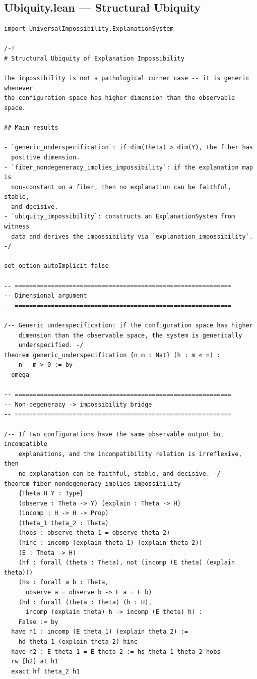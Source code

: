 \documentclass[11pt,a4paper]{article}
\begin{document}
\subsection{Ubiquity.lean --- Structural Ubiquity}
\label{app:lean-ubiquity}

\begin{lstlisting}[caption={Ubiquity.lean --- complete file},label={lst:ubiquity}]
import UniversalImpossibility.ExplanationSystem

/-!
# Structural Ubiquity of Explanation Impossibility

The impossibility is not a pathological corner case -- it is generic whenever
the configuration space has higher dimension than the observable space.

## Main results

- `generic_underspecification`: if dim(Theta) > dim(Y), the fiber has
  positive dimension.
- `fiber_nondegeneracy_implies_impossibility`: if the explanation map is
  non-constant on a fiber, then no explanation can be faithful, stable,
  and decisive.
- `ubiquity_impossibility`: constructs an ExplanationSystem from witness
  data and derives the impossibility via `explanation_impossibility`.
-/

set_option autoImplicit false

-- ============================================================
-- Dimensional argument
-- ============================================================

/-- Generic underspecification: if the configuration space has higher
    dimension than the observable space, the system is generically
    underspecified. -/
theorem generic_underspecification {n m : Nat} (h : m < n) :
    n - m > 0 := by
  omega

-- ============================================================
-- Non-degeneracy -> impossibility bridge
-- ============================================================

/-- If two configurations have the same observable output but incompatible
    explanations, and the incompatibility relation is irreflexive, then
    no explanation can be faithful, stable, and decisive. -/
theorem fiber_nondegeneracy_implies_impossibility
    {Theta H Y : Type}
    (observe : Theta -> Y) (explain : Theta -> H)
    (incomp : H -> H -> Prop)
    (theta_1 theta_2 : Theta)
    (hobs : observe theta_1 = observe theta_2)
    (hinc : incomp (explain theta_1) (explain theta_2))
    (E : Theta -> H)
    (hf : forall (theta : Theta), not (incomp (E theta) (explain theta)))
    (hs : forall a b : Theta,
      observe a = observe b -> E a = E b)
    (hd : forall (theta : Theta) (h : H),
      incomp (explain theta) h -> incomp (E theta) h) :
    False := by
  have h1 : incomp (E theta_1) (explain theta_2) :=
    hd theta_1 (explain theta_2) hinc
  have h2 : E theta_1 = E theta_2 := hs theta_1 theta_2 hobs
  rw [h2] at h1
  exact hf theta_2 h1


\end{lstlisting}
\end{document}
